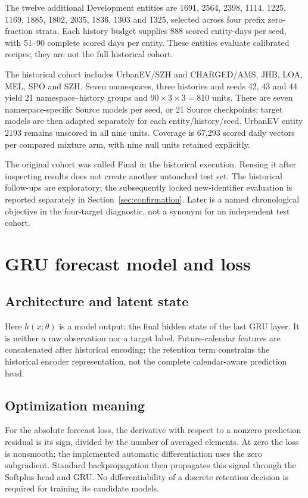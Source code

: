 \documentclass[pdflatex,iicol,sn-mathphys-num]{sn-jnl}
\begin{document}
The twelve additional Development entities are 1691, 2564, 2398, 1114, 1225, 1169, 1885, 1802, 2035, 1836, 1303 and 1325, selected across four prefix zero-fraction strata. Each history budget supplies 888 scored entity-days per seed, with 51--90 complete scored days per entity. These entities evaluate calibrated recipes; they are not the full historical cohort.

The historical cohort includes UrbanEV/SZH and CHARGED/AMS, JHB, LOA, MEL, SPO and SZH. Seven namespaces, three histories and seeds 42, 43 and 44 yield 21 namespace--history groups and $90\times3\times3=810$ units. There are seven namespace-specific Source models per seed, or 21 Source checkpoints; target models are then adapted separately for each entity/history/seed. UrbanEV entity 2193 remains unscored in all nine units. Coverage is 67,293 scored daily vectors per compared mixture arm, with nine null units retained explicitly.

The original cohort was called Final in the historical execution. Reusing it after inspecting results does not create another untouched test set. The historical follow-ups are exploratory; the subsequently locked new-identifier evaluation is reported separately in Section~\ref{sec:confirmation}. Later is a named chronological objective in the four-target diagnostic, not a synonym for an independent test cohort.

\section{GRU forecast model and loss}
\subsection{Architecture and latent state}


Here $h(x;\theta)$ is a model output: the final hidden state of the last GRU layer. It is neither a raw observation nor a target label. Future-calendar features are concatenated after historical encoding; the retention term constrains the historical encoder representation, not the complete calendar-aware prediction head.

\subsection{Optimization meaning}
For the absolute forecast loss, the derivative with respect to a nonzero prediction residual is its sign, divided by the number of averaged elements. At zero the loss is nonsmooth; the implemented automatic differentiation uses the zero subgradient. Standard backpropagation then propagates this signal through the Softplus head and GRU. No differentiability of a discrete retention decision is required for training its candidate models.
\end{document}
